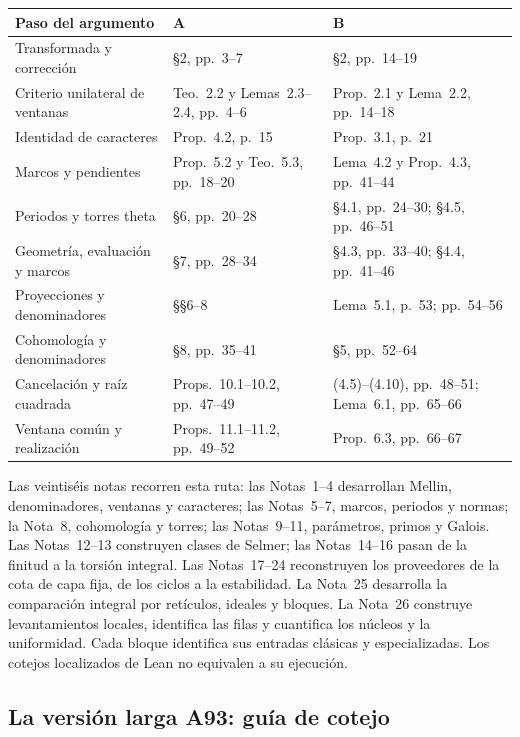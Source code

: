 \begin{center}
\small
\begin{tabularx}{\textwidth}{@{}>{\raggedright\arraybackslash}p{}YY@{}}
\toprule
\textbf{Paso del argumento} & \textbf{A} & \textbf{B} \\
\midrule
Transformada y corrección & §2, pp.~3--7 & §2, pp.~14--19 \\
Criterio unilateral de ventanas & Teo.~2.2 y Lemas~2.3--2.4, pp.~4--6 & Prop.~2.1 y Lema~2.2, pp.~14--18 \\
Identidad de caracteres & Prop.~4.2, p.~15 & Prop.~3.1, p.~21 \\
Marcos y pendientes & Prop.~5.2 y Teo.~5.3, pp.~18--20 & Lema~4.2 y Prop.~4.3, pp.~41--44 \\
Periodos y torres theta & §6, pp.~20--28 & §4.1, pp.~24--30; §4.5, pp.~46--51 \\
Geometría, evaluación y marcos & §7, pp.~28--34 & §4.3, pp.~33--40; §4.4, pp.~41--46 \\
Proyecciones y denominadores & §§6--8 & Lema~5.1, p.~53; pp.~54--56 \\
Cohomología y denominadores & §8, pp.~35--41 & §5, pp.~52--64 \\
Cancelación y raíz cuadrada & Props.~10.1--10.2, pp.~47--49 & (4.5)--(4.10), pp.~48--51; Lema~6.1, pp.~65--66 \\
Ventana común y realización & Props.~11.1--11.2, pp.~49--52 & Prop.~6.3, pp.~66--67 \\
\bottomrule
\end{tabularx}
\end{center}

Las veintiséis notas recorren esta ruta: las Notas~1--4 desarrollan
Mellin, denominadores, ventanas y caracteres; las Notas~5--7,
marcos, periodos y normas; la Nota~8, cohomología y torres;
las Notas~9--11, parámetros, primos y Galois. Las Notas~12--13
construyen clases de Selmer; las Notas~14--16 pasan de la finitud
a la torsión integral. Las Notas~17--24 reconstruyen los proveedores
de la cota de capa fija, de los ciclos a la estabilidad.
La Nota~25 desarrolla la comparación integral por retículos,
ideales y bloques. La Nota~26 construye levantamientos locales,
identifica las filas y cuantifica los núcleos y la uniformidad.
Cada bloque
identifica sus entradas clásicas y especializadas. Los cotejos
localizados de Lean no equivalen a su ejecución.

\clearpage
\subsection{La versión larga A93: guía de cotejo}
\label{subsec:guia-a93}

